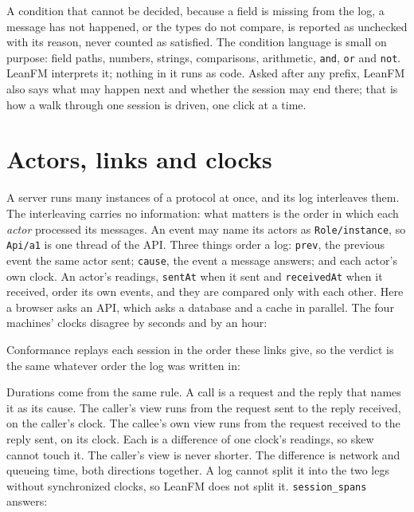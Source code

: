  A condition that cannot be decided,
because a field is missing from the log, a message has not happened, or the types
do not compare, is reported as unchecked with its reason, never counted as
satisfied. The condition language is small on purpose: field paths, numbers,
strings, comparisons, arithmetic, \texttt{and}, \texttt{or} and \texttt{not}.
LeanFM interprets it; nothing in it runs as code. Asked after any prefix, LeanFM also says what may happen next
and whether the session may end there; that is how a walk through one session is
driven, one click at a time.

\section{Actors, links and clocks}
\label{sec:actors}

A server runs many instances of a protocol at once, and its log interleaves
them. The interleaving carries no information: what matters is the order in
which each \emph{actor} processed its messages. An event may name its actors as
\texttt{Role/instance}, so \texttt{Api/a1} is one thread of the API.
Three things order a log: \texttt{prev}, the previous event the same actor
sent; \texttt{cause}, the event a message answers; and each actor's own clock.
An actor's readings, \texttt{sentAt} when it sent and \texttt{receivedAt} when it
received, order its own events, and they are compared only with each other. Here
a browser asks an API, which asks a database and a cache in parallel. The four
machines' clocks disagree by seconds and by an hour:



Conformance replays each session in the order these links give, so the verdict
is the same whatever order the log was written in:



Durations come from the same rule. A call is a request and the reply that names
it as its cause. The caller's view runs from the request sent to the reply
received, on the caller's clock. The callee's own view runs from the request
received to the reply sent, on its clock. Each is a difference of one clock's
readings, so skew cannot touch it. The caller's view is never shorter. The
difference is network and queueing time, both directions together. A log cannot
split it into the two legs without synchronized clocks, so LeanFM does not
split it. \texttt{session\_spans} answers:

